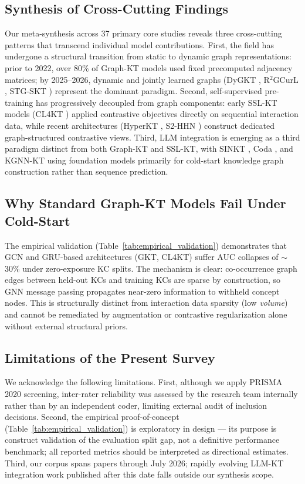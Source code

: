 \documentclass[10pt,journal,compsoc]{IEEEtran}
\begin{document}
\subsection{Synthesis of Cross-Cutting Findings}
Our meta-synthesis across 37 primary core studies reveals three cross-cutting patterns that transcend individual model contributions. First, the field has undergone a structural transition from static to dynamic graph representations: prior to 2022, over 80\% of Graph-KT models used fixed precomputed adjacency matrices; by 2025--2026, dynamic and jointly learned graphs (DyGKT \cite{KT038_DyGKT_2024}, R$^2$GCurL \cite{KT077_R2GCurL_2026}, STG-SKT \cite{KT079_STGSKT_2026}) represent the dominant paradigm. Second, self-supervised pre-training has progressively decoupled from graph components: early SSL-KT models (CL4KT \cite{KT039_CL4KT_2022}) applied contrastive objectives directly on sequential interaction data, while recent architectures (HyperKT \cite{KT066_HyperKT_2025}, S2-HHN \cite{KT042_S2HHN_2023}) construct dedicated graph-structured contrastive views. Third, LLM integration is emerging as a third paradigm distinct from both Graph-KT and SSL-KT, with SINKT \cite{KT044_SINKT_2024}, Coda \cite{KT070_Coda_2025}, and KGNN-KT \cite{KT076_KGNNKT_2025} using foundation models primarily for cold-start knowledge graph construction rather than sequence prediction.

\subsection{Why Standard Graph-KT Models Fail Under Cold-Start}
The empirical validation (Table~\ref{tab:empirical_validation}) demonstrates that GCN and GRU-based architectures (GKT, CL4KT) suffer AUC collapses of $\sim$30\% under zero-exposure KC splits. The mechanism is clear: co-occurrence graph edges between held-out KCs and training KCs are sparse by construction, so GNN message passing propagates near-zero information to withheld concept nodes. This is structurally distinct from interaction data sparsity (low \emph{volume}) and cannot be remediated by augmentation or contrastive regularization alone without external structural priors.

\subsection{Limitations of the Present Survey}
We acknowledge the following limitations. First, although we apply PRISMA 2020 screening, inter-rater reliability was assessed by the research team internally rather than by an independent coder, limiting external audit of inclusion decisions. Second, the empirical proof-of-concept (Table~\ref{tab:empirical_validation}) is exploratory in design --- its purpose is construct validation of the evaluation split gap, not a definitive performance benchmark; all reported metrics should be interpreted as directional estimates. Third, our corpus spans papers through July 2026; rapidly evolving LLM-KT integration work published after this date falls outside our synthesis scope.
\end{document}

